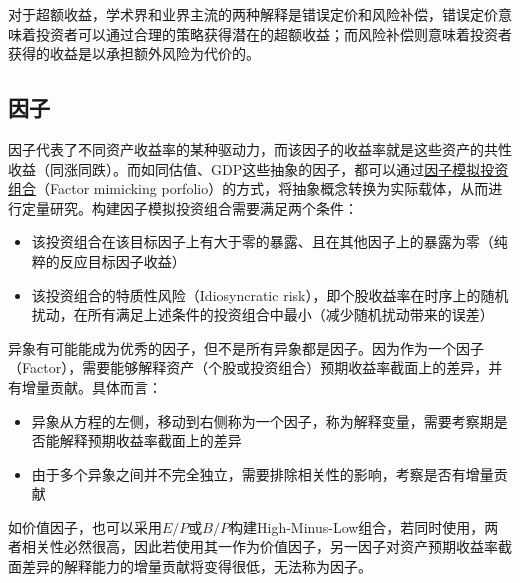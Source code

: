 \documentclass[11pt]{article}
\begin{document}
对于超额收益，学术界和业界主流的两种解释是错误定价和风险补偿，错误定价意味着投资者可以通过合理的策略获得潜在的超额收益；而风险补偿则意味着投资者获得的收益是以承担额外风险为代价的。

\subsection{因子}

因子代表了不同资产收益率的某种驱动力，而该因子的收益率就是这些资产的共性收益（同涨同跌）。而如同估值、GDP这些抽象的因子，都可以通过\uline{因子模拟投资组合}（Factor mimicking porfolio）的方式，将抽象概念转换为实际载体，从而进行定量研究。构建因子模拟投资组合需要满足两个条件：
\begin{itemize}
    \item 该投资组合在该目标因子上有大于零的暴露、且在其他因子上的暴露为零（纯粹的反应目标因子收益）
    \item 该投资组合的特质性风险（Idiosyncratic risk），即个股收益率在时序上的随机扰动，在所有满足上述条件的投资组合中最小（减少随机扰动带来的误差）
\end{itemize}

异象有可能能成为优秀的因子，但不是所有异象都是因子。因为作为一个因子（Factor），需要能够解释资产（个股或投资组合）预期收益率截面上的差异，并有增量贡献。具体而言：
\begin{itemize}
    \item 异象从方程的左侧，移动到右侧称为一个因子，称为解释变量，需要考察期是否能解释预期收益率截面上的差异
    \item 由于多个异象之间并不完全独立，需要排除相关性的影响，考察是否有增量贡献
\end{itemize}

如价值因子，也可以采用$E/P$或$B/P$构建High-Minus-Low组合，若同时使用，两者相关性必然很高，因此若使用其一作为价值因子，另一因子对资产预期收益率截面差异的解释能力的增量贡献将变得很低，无法称为因子。
\end{document}
